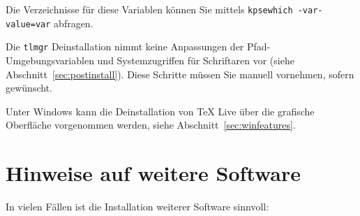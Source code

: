 \documentclass[12pt,ngerman,a4paper,fullparskip]{report}
\newcommand{\code}[1]{\texttt{#1}}
\newcommand{\prog}[1]{\texttt{#1}}
\begin{document}
\noindent Die Verzeichnisse für diese Variablen können Sie mittels \code{kpsewhich -var-value=\code{var}} abfragen.

Die \prog{tlmgr} Deinstallation nimmt keine Anpassungen der Pfad-Umgebungsvariablen und Systemzugriffen für Schriftaren vor (siehe 
Abschnitt~\ref{sec:postinstall}). Diese Schritte müssen Sie manuell vornehmen, sofern gewünscht.

Unter Windows kann die Deinstallation von TeX Live über die grafische Oberfläche vorgenommen werden, siehe Abschnitt~\ref{sec:winfeatures}.

\section{Hinweise auf weitere Software}

In vielen Fällen ist die Installation weiterer Software sinnvoll:
\end{document}
